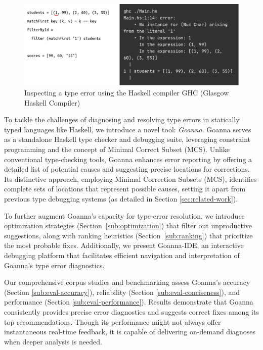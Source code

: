 \documentclass[pdflatex,sn-mathphys-num]{sn-jnl}%
\begin{document}
    \begin{figure}[ht!]
        \centering
        \includegraphics[width=\linewidth]{images/motivation}
        \caption{Inspecting a type error using the Haskell compiler GHC (Glasgow Haskell Compiler)}
        \label{fig:motivation}
    \end{figure}

To tackle the challenges of diagnosing and resolving type errors in statically typed languages like Haskell, we introduce a novel tool: \textit{Goanna}. Goanna serves as a standalone Haskell type checker and debugging suite, leveraging constraint programming and the concept of Minimal Correct Subset (MCS). Unlike conventional type-checking tools, Goanna enhances error reporting by offering a detailed list of potential causes and suggesting precise locations for corrections. Its distinctive approach, employing Minimal Correction Subsets (MCS), identifies complete sets of locations that represent possible causes, setting it apart from previous type debugging systems (as detailed in Section \ref{sec:related-work}).

To further augment Goanna's capacity for type-error resolution, we introduce optimization strategies (Section~\ref{sub:optimization}) that filter out unproductive suggestions, along with ranking heuristics (Section~\ref{sub:ranking}) that prioritize the most probable fixes. Additionally, we present Goanna-IDE, an interactive debugging platform that facilitates efficient navigation and interpretation of Goanna's type error diagnostics.

Our comprehensive corpus studies and benchmarking assess Goanna's accuracy (Section \ref{sub:eval-accuracy}), reliability (Section \ref{sub:eval-conciseness}), and performance (Section \ref{sub:eval-performance}). Results demonstrate that Goanna consistently provides precise error diagnostics and suggests correct fixes among its top recommendations. Though its performance might not always offer instantaneous real-time feedback, it is capable of delivering on-demand diagnoses when deeper analysis is needed.
\end{document}
